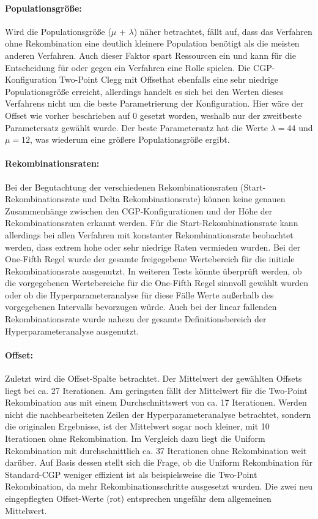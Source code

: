\paragraph{Populationsgröße:}
Wird die Populationsgröße ($\mu$ + $\lambda$) näher betrachtet, fällt auf, dass das Verfahren ohne Rekombination eine deutlich kleinere Population benötigt als die meisten anderen Verfahren.
Auch dieser Faktor spart Ressourcen ein und kann für die Entscheidung für oder gegen ein Verfahren eine Rolle spielen.
Die CGP-Konfiguration \glqq Two-Point Clegg mit Offset\grqq\space hat ebenfalls eine sehr niedrige Populationsgröße erreicht, allerdings handelt es sich bei den Werten dieses Verfahrens nicht um die beste Parametrierung der Konfiguration.
Hier wäre der Offset wie vorher beschrieben auf 0 gesetzt worden, weshalb nur der zweitbeste Parametersatz gewählt wurde.
Der beste Parametersatz hat die Werte $\lambda=44$ und $\mu=12$, was wiederum eine größere Populationsgröße ergibt.
\paragraph{Rekombinationsraten:}
Bei der Begutachtung der verschiedenen Rekombinationsraten (Start-Rekombinationsrate und Delta Rekombinationsrate) können keine genauen Zusammenhänge zwischen den CGP-Konfigurationen und der Höhe der Rekombinationsraten erkannt werden.
Für die Start-Rekombinationsrate kann allerdings bei allen Verfahren mit konstanter Rekombinationsrate beobachtet werden, dass extrem hohe oder sehr niedrige Raten vermieden wurden.
Bei der One-Fifth Regel wurde der gesamte freigegebene Wertebereich für die initiale Rekombinationsrate ausgenutzt.
In weiteren Tests könnte überprüft werden, ob die vorgegebenen Wertebereiche für die One-Fifth Regel sinnvoll gewählt wurden oder ob die Hyperparameteranalyse für diese Fälle Werte außerhalb des vorgegebenen Intervalls bevorzugen würde.
Auch bei der linear fallenden Rekombinationsrate wurde nahezu der gesamte Definitionsbereich der Hyperparameteranalyse ausgenutzt.
\paragraph{Offset:}
Zuletzt wird die Offset-Spalte betrachtet.
Der Mittelwert der gewählten Offsets liegt bei ca. 27 Iterationen.
Am geringsten fällt der Mittelwert für die Two-Point Rekombination aus mit einem Durchschnittswert von ca. 17 Iterationen.
Werden nicht die nachbearbeiteten Zeilen der Hyperparameteranalyse betrachtet, sondern die originalen Ergebnisse, ist der Mittelwert sogar noch kleiner, mit 10 Iterationen ohne Rekombination.
Im Vergleich dazu liegt die Uniform Rekombination mit durchschnittlich ca. 37 Iterationen ohne Rekombination weit darüber.
Auf Basis dessen stellt sich die Frage, ob die Uniform Rekombination für Standard-CGP weniger effizient ist als beispielsweise die Two-Point Rekombination, da mehr Rekombinationsschritte ausgesetzt wurden.
Die zwei neu eingepflegten Offset-Werte (rot) entsprechen ungefähr dem allgemeinen Mittelwert.

